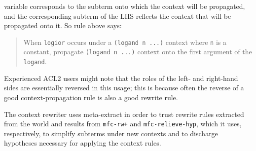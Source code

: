 variable corresponds to the subterm onto which the context will be
propagated, and the corresponding subterm of the LHS reflects the
context that will be propagated onto it.  So rule above says:
\begin{quote}
When \texttt{logior} occurs under a \texttt{(logand n ...)} context where
\texttt{n} is a constant, propagate \texttt{(logand n ...)} context
onto the first argument of the \texttt{logand}.
\end{quote}
\noindent Experienced ACL2 users might note that the roles of the
left- and right-hand sides are essentially reversed in this usage;
this is because often the reverse of a good context-propagation rule
is also a good rewrite rule.

\begin{comment}
[From Matt] I'm not sure if I'm following what's above.  At first it
seemed to me that the displayed rule is intended to explain how
contexts are propagated in the logbitp example above.  Now I think
(but I'm not sure) that it's just an analogous sort of rule, but we'd
need for example to propagate into logior expressions to do that
logbitp example.  Can you clarify a bit?

[Sol] Fixed this up a bit, hopefully makes more sense now.  The
original logbitp example was totally bogus so thanks for catching
that.  The new example is actually correct (added
context-rw-example.lisp to make sure).
\end{comment}

The context rewriter uses meta-extract in order to trust rewrite rules
extracted from the world and results from \texttt{mfc-rw+} and
\texttt{mfc-relieve-hyp}, which it uses, respectively, to simplify
subterms under new contexts and to discharge hypotheses necessary for
applying the context rules.

\begin{comment}
[From Matt] I haven't given the following any thought at all, but I
wonder if patterned congruences could provide an alternate solution.
Maybe that doesn't matter, but if offhand you (Sol) think so, you
could add such words and reference the ITP 2014 paper on patterned
congruences (I'll send you a reference if you ask).

[Sol] Patterned congruences are still only capable of propagating
contexts that have defined equivalence relations, whereas this and
Nary support something like ``parameterized equivalences'' (really via
parameterized fixing functions such as, e.g., loghead or in this case
logand).
\end{comment}

